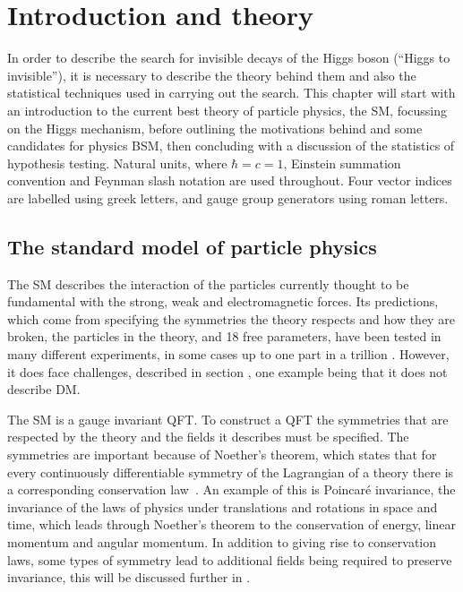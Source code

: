 \chapter{Introduction and theory}
\label{chap:theory}
In order to describe the search for invisible decays of the Higgs boson (``Higgs to invisible''), it is necessary to describe the theory behind them and also the statistical techniques used in carrying out the search. This chapter will start with an introduction to the current best theory of particle physics, the \ac{SM}, focussing on the Higgs mechanism, before outlining the motivations behind and some candidates for physics \ac{BSM}, then concluding with a discussion of the statistics of hypothesis testing. Natural units, where $\hbar=c=1$, Einstein summation convention and Feynman slash notation are used throughout. Four vector indices are labelled using greek letters, and gauge group generators using roman letters.

\section{The standard model of particle physics}
\label{sec:SM}
The SM describes the interaction of the particles currently thought to be fundamental with the strong, weak and electromagnetic forces. Its predictions, which come from specifying the symmetries the theory respects and how they are broken, the particles in the theory, and 18 free parameters, have been tested in many different experiments, in some cases up to one part in a trillion \cite{PhysRevLett.100.120801}. However, it does face challenges, described in section , one example being that it does not describe \ac{DM}. 

The SM is a gauge invariant \ac{QFT}. To construct a QFT the symmetries that are respected by the theory and the fields it describes must be specified. The symmetries are important because of Noether's theorem, which states that for every continuously differentiable symmetry of the Lagrangian of a theory there is a corresponding conservation law~\cite{Noether:1918zz,doi:10.1080/00411457108231446}. An example of this is Poincar\'e invariance, the invariance of the laws of physics under translations and rotations in space and time, which leads through Noether's theorem to the conservation of energy, linear momentum and angular momentum. In addition to giving rise to conservation laws, some types of symmetry lead to additional fields being required to preserve invariance, this will be discussed further in  \cite{PhysRev.96.191}.

